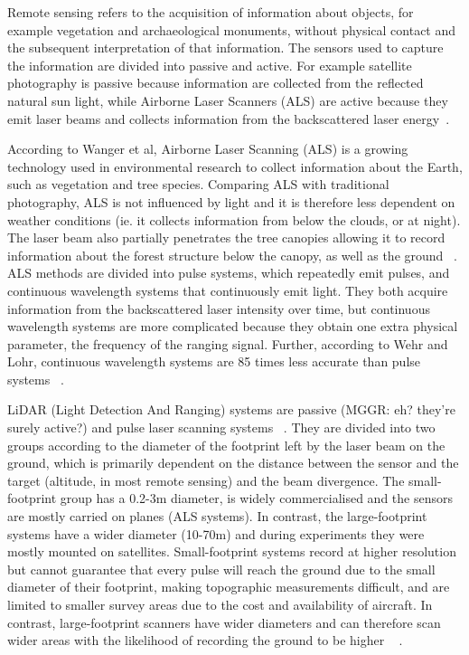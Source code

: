 \documentclass{subfiles}
\begin{document}
	\par Remote sensing refers to the acquisition of information about objects, {\color{blue} for example} vegetation and archaeological monuments, without physical contact and the subsequent interpretation of that information.  The sensors used to capture the information are divided into passive and active. For example satellite photography is passive because information are collected from the {\color{blue} reflected natural} sun light, while Airborne Laser Scanners (ALS) are active because they emit laser beams and collects information from the backscattered laser energy~\cite{Smith2012}.
	
	\par According to Wanger et al, Airborne Laser Scanning (ALS) is a growing technology used in environmental research to collect information about the Earth, such as vegetation and tree species. Comparing ALS with traditional photography, {\color{blue} ALS is not influenced by light and it is therefore less dependent on weather conditions (ie. it collects information from below the clouds, or at night)}. The laser beam also partially penetrates the tree canopies {\color{blue} allowing it to record} information about the forest structure below the canopy, as well as the ground ~\cite{Wanger2004}. {\color{blue}ALS methods are divided into pulse systems, which repeatedly emit pulses, and continuous wavelength systems that continuously emit light. They both acquire information from the backscattered laser intensity over time, but continuous wavelength systems are more complicated because they obtain one extra physical parameter, the frequency of the ranging signal}. Further, according to Wehr and Lohr, continuous wavelength systems are 85 times less accurate than pulse systems ~\cite{Wehr1999}.
	
	\par {\color{blue} LiDAR (Light Detection And Ranging) systems are passive (MGGR: eh? they're surely active?) and pulse laser scanning systems ~\cite{Wehr1999}. They are divided into two groups according to the diameter of the footprint left by the laser beam on the ground, which is primarily dependent on the distance between the sensor and the target (altitude, in most remote sensing) and the beam divergence. The small-footprint group has a 0.2-3m diameter, is widely commercialised and the sensors are mostly carried on planes (ALS systems). In contrast, the large-footprint systems have a wider diameter (10-70m) and during experiments they were mostly mounted on satellites. Small-footprint systems record at higher resolution but cannot guarantee that every pulse will reach the ground due to the small diameter of their footprint, making topographic measurements difficult, and are limited to smaller survey areas due to the cost and availability of aircraft. In contrast, large-footprint scanners have wider diameters and can therefore scan wider areas with the likelihood of recording the ground to be higher ~\cite{Mallet2009} }. 
	
\end{document}
